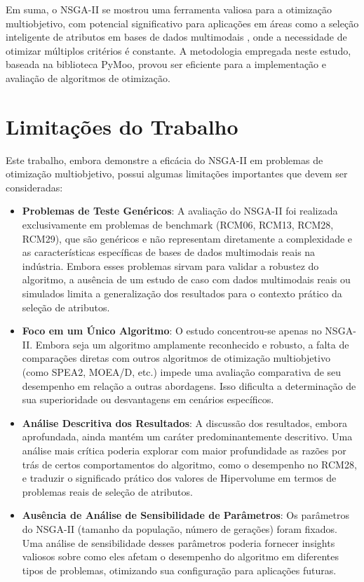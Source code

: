 \documentclass[12pt,openright,oneside,a4paper,english,brazil]{abntex2}
\begin{document}
Em suma, o NSGA-II se mostrou uma ferramenta valiosa para a otimização multiobjetivo, com potencial significativo para aplicações em áreas como a seleção inteligente de atributos em bases de dados multimodais \cite{hamdani2007multi, yazdinejad2023optimized}, onde a necessidade de otimizar múltiplos critérios é constante. A metodologia empregada neste estudo, baseada na biblioteca PyMoo, provou ser eficiente para a implementação e avaliação de algoritmos de otimização.


\section*{Limitações do Trabalho}
Este trabalho, embora demonstre a eficácia do NSGA-II em problemas de otimização multiobjetivo, possui algumas limitações importantes que devem ser consideradas:
\begin{itemize}
    \item \textbf{Problemas de Teste Genéricos}: A avaliação do NSGA-II foi realizada exclusivamente em problemas de benchmark (RCM06, RCM13, RCM28, RCM29), que são genéricos e não representam diretamente a complexidade e as características específicas de bases de dados multimodais reais na indústria. Embora esses problemas sirvam para validar a robustez do algoritmo, a ausência de um estudo de caso com dados multimodais reais ou simulados limita a generalização dos resultados para o contexto prático da seleção de atributos.
    \item \textbf{Foco em um Único Algoritmo}: O estudo concentrou-se apenas no NSGA-II. Embora seja um algoritmo amplamente reconhecido e robusto, a falta de comparações diretas com outros algoritmos de otimização multiobjetivo (como SPEA2, MOEA/D, etc.) impede uma avaliação comparativa de seu desempenho em relação a outras abordagens. Isso dificulta a determinação de sua superioridade ou desvantagens em cenários específicos.
    \item \textbf{Análise Descritiva dos Resultados}: A discussão dos resultados, embora aprofundada, ainda mantém um caráter predominantemente descritivo. Uma análise mais crítica poderia explorar com maior profundidade as razões por trás de certos comportamentos do algoritmo, como o desempenho no RCM28, e traduzir o significado prático dos valores de Hipervolume em termos de problemas reais de seleção de atributos.
    \item \textbf{Ausência de Análise de Sensibilidade de Parâmetros}: Os parâmetros do NSGA-II (tamanho da população, número de gerações) foram fixados. Uma análise de sensibilidade desses parâmetros poderia fornecer insights valiosos sobre como eles afetam o desempenho do algoritmo em diferentes tipos de problemas, otimizando sua configuração para aplicações futuras.
\end{itemize}
\end{document}
